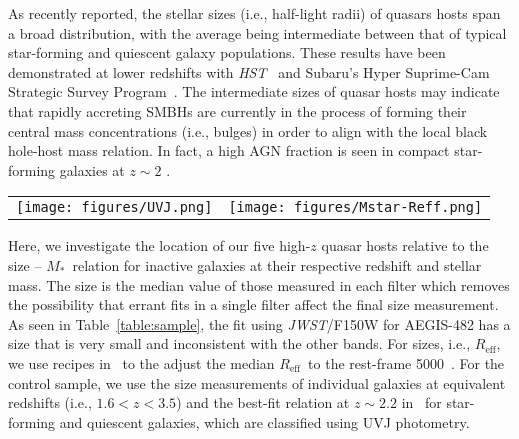 \documentclass[twocolumn,]{aastex631}
\newcommand{\sersic}{S\'ersic}
\newcommand{\reff}{{$R_{\mathrm{eff}}$}}
\newcommand{\smass}{{$M_*$}}
\newcommand{\hst}{{\it HST}}
\newcommand{\jwst}{{\it JWST}}
\newcommand{\angstrom}{\text{\normalfont\AA}}
\begin{document}
As recently reported, the stellar sizes (i.e., half-light radii) of quasars hosts span a broad distribution, with the average being intermediate between that of typical star-forming and quiescent galaxy populations. These results have been demonstrated at lower redshifts with \hst~\citep[$z\sim1.5$,][]{Silverman2019} and Subaru's Hyper Suprime-Cam Strategic Survey Program~\citep[$z < 1$,][]{Li2021}. The intermediate sizes of quasar hosts may indicate that rapidly accreting SMBHs are currently in the process of forming their central mass concentrations (i.e., bulges) in order to align with the local black hole-host mass relation. In fact, a high AGN fraction is seen in compact star-forming galaxies at $z\sim2$ \citep{Kocevski2017}.


\begin{figure*}
\centering
\begin{tabular}{c c}
\hspace*{-1cm}  
{\texttt{[image: figures/UVJ.png]}}&
{\texttt{[image: figures/Mstar-Reff.png]}}\\
\end{tabular}
\caption{$Left:$ UVJ diagram for the five quasar systems, together with the sample from CANDELS at $1.6<z<3.5$. Two systems whose 4000~\angstrom\ break is not constrained by \jwst\ are filled in white.
$Right:$ Galaxy size--\smass\ distribution and relations. The \sersic\ index values are presented by the symbol color. For SDSS1420B, \reff\ is labeled using an arrow to indicate an upper limit. We also show the best-fit relation reported in~\citet{vdW+2014} for the star-forming (blue line) and quiescent (red line) at $z\sim2.2$. We also include six broad-line AGNs at $1.6<z<1.7$ from~\citet{Ding2020} based on \hst/WFC3 imaging. 
\label{fig:sizemass}}
\end{figure*}



Here, we investigate the location of our five high-$z$ quasar hosts relative to the size -- \smass\ relation for inactive galaxies at their respective redshift and stellar mass. The size is the median value of those measured in each filter which removes the possibility that errant fits in a single filter affect the final size measurement. As seen in Table~\ref{table:sample}, the fit using \jwst/F150W for AEGIS-482 has a size that is very small and inconsistent with the other bands. For sizes, i.e., \reff, we use recipes in~\citet{vdW+2014} to the adjust the median \reff\ to the rest-frame 5000~\angstrom. For the control sample, we use the size measurements of individual galaxies at equivalent redshifts (i.e., $1.6<z<3.5$) and the best-fit relation at $z\sim2.2$ in~\citet{vdW+2014} for star-forming and quiescent galaxies, which are classified using UVJ photometry. 
\end{document}
